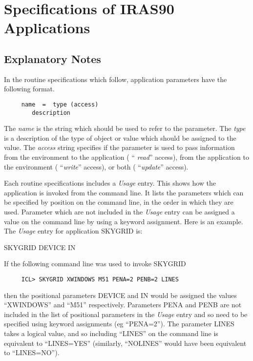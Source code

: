 \section{Specifications of IRAS90 Applications}
\label{ap:full}
\subsection{Explanatory Notes}

In the routine specifications which follow, application parameters have the 
following format. 

\begin{verbatim}
     name  =  type (access)
        description
\end{verbatim}

The {\em name} is the string which should be used to refer to the parameter. The
{\em type} is a description of the type of object or value which should be
assigned to the value. The {\em access} string specifies if the parameter is
used to pass information from the environment to the application ( ``{\em
read}'' access), from the application to the environment ( ``{\em write}'' 
access), or both ( ``{\em update}'' access). 

Each routine specifications includes a {\em Usage\/} entry.  This shows how the
application is invoked from the command line.   It lists the parameters which
can be specified by position on the command line, in the order in which they
are used. Parameter which are not included in the {\em Usage\/} entry can be
assigned a value on the command line by using a keyword assignment. Here is an
example. The {\em Usage\/} entry for application SKYGRID is:

\bigskip

{\ssttt \hspace*{1.0em}
        SKYGRID DEVICE IN
}

If the following command line was used to invoke SKYGRID

\small
\begin{verbatim}
     ICL> SKYGRID XWINDOWS M51 PENA=2 PENB=2 LINES
\end{verbatim}
\normalsize

then the positional parameters DEVICE and IN would be assigned the values 
``XWINDOWS'' and ``M51'' respectively. Parameters PENA and PENB are not included
in the list of positional parameters in the {\em Usage\/} entry and so need to
be specified using keyword assignments (eg ``PENA=2''). The parameter LINES
takes a logical value, and so including ``LINES'' on the command line is
equivalent to ``LINES=YES'' (similarly, ``NOLINES'' would have been equivalent
to ``LINES=NO'').

